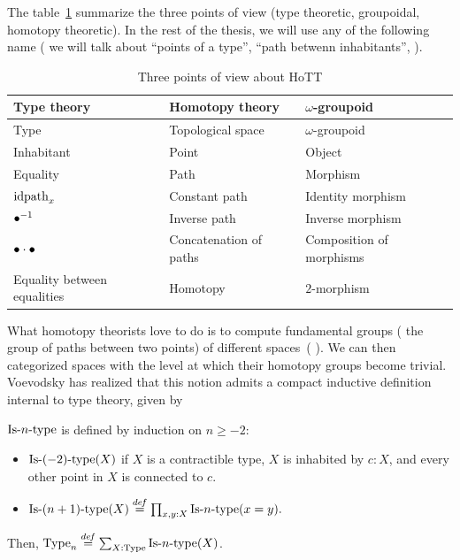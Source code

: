 The table~\ref{fig:3pw} summarize the three points of view (type
theoretic, groupoidal, homotopy theoretic). In the rest of the thesis,
we will use any of the following name (\eg{} we will talk about
``points of a type'', ``path betwenn inhabitants'', \etc{}).

\begin{table}[h]
  \centering
  \begin{tabular}{|l|l|l|}
    \hline
    Type theory & Homotopy theory & $\omega$-groupoid \\
    \hline \hline
    Type & Topological space & $\omega$-groupoid \\
    \hline
    Inhabitant & Point & Object \\
    \hline
    Equality & Path & Morphism \\
    \hline
    $\mathrm{idpath}_x$ & Constant path & Identity morphism \\
    \hline
    $\bullet^{-1}$ & Inverse path & Inverse morphism \\
    \hline
    $\bullet\cdot \bullet$ & Concatenation of paths & Composition of
                                                       morphisms \\
    \hline
    Equality between equalities & Homotopy & $2$-morphism\\
    \hline
  \end{tabular}
  \caption{Three points of view about HoTT}
  \label{fig:3pw}
\end{table}


What homotopy theorists love to do is to compute fundamental groups
(\ie{} the group of paths between two points) of
different spaces~(\cite{wangxu}
\cite{hutchings2011introduction}). We
can then categorized spaces with the level at which their homotopy
groups become trivial. Voevodsky has realized that this notion admits
a compact inductive definition internal to type theory, given by
\begin{defi}
  $\mathop{\mathrm{Is{\hbox{-}}}n\mathrm{{\hbox{-}} type}}$ is defined by induction on $n\geqslant -2$:
  \begin{itemize}
  \item $\mathop{\mathrm{Is{\hbox{-}}}(-2)\mathrm{{\hbox{-}} type}}(X)$ if $X$ is a contractible type, \ie{} $X$
    is inhabited by $c:X$, and every other point in $X$ is connected to $c$.
  \item $\mathop{\mathrm{Is{\hbox{-}}}(n+1)\mathrm{{\hbox{-}} type}}(X) \overset{de\hspace{-0.2ex}f}{=} \prod_{x,y:X} \mathop{\mathrm{Is{\hbox{-}}}n\mathrm{{\hbox{-}} type}} (x=y).$
  \end{itemize}
  Then, $\operatorname{Type}_n \overset{de\hspace{-0.2ex}f}{=} \sum_{X:\operatorname{Type}} \mathop{\mathrm{Is{\hbox{-}}}n\mathrm{{\hbox{-}} type}}(X)$.
\end{defi}

